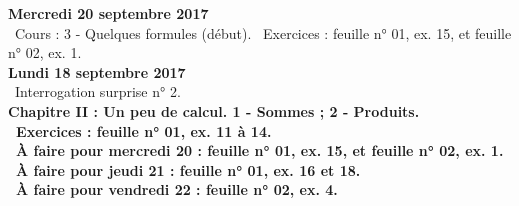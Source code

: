 \documentclass[12pt,a4paper]{article}
\begin{document}
%  
% 
% 
% 

\noindent\textbf{\bf Mercredi 20 septembre 2017}\\
\bu\ Cours : 3 - Quelques formules (début).
\bu\ Exercices : feuille n° 01, ex. 15, et feuille n° 02, ex. 1.\vspace{.4cm}\\

\noindent\textbf{\bf Lundi 18 septembre 2017}\\
\bu\ Interrogation surprise n° 2.\\
\bf Chapitre II \rm : Un peu de calcul. 1 - Sommes ; 2 - Produits.\\
\bu\ Exercices : feuille n° 01, ex. 11 à 14.\\
\bu\ À faire pour mercredi 20 : feuille n° 01, ex. 15, et feuille n° 02, ex. 1.\\
\bu\ À faire pour jeudi 21 : feuille n° 01, ex. 16 et 18.\\
\bu\ À faire pour vendredi 22 : feuille n° 02, ex. 4.\vspace{.4cm}\\
\end{document}
